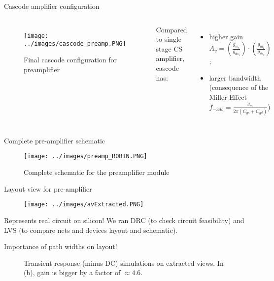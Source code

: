 \documentclass[aspectratio=169,xcolor=dvipsnames]{beamer}
\begin{document}
	\begin{frame}{Cascode amplifier configuration}
		\begin{columns}[c] %
			
			\begin{figure}[h!]
				\centering
				\texttt{[image: ../images/cascode\_preamp.PNG]}
				\label{Cascode_preamp}
				\caption{Final cascode configuration for preamplifier}
			\end{figure}
			
			Compared to single stage CS amplifier, cascode has:
			\begin{itemize}
				\item higher gain $A_v = \left(\frac{g_{m_1}}{g_{ds_1}}\right)\cdot \left(\frac{g_{m_2}}{g_{ds_2}}\right)$;
				\item larger bandwidth (consequence of the Miller Effect $f_{-3db} = \frac{g_m}{2\pi(C_{gs} + C_{gd})}$)
			\end{itemize}
			
		\end{columns}
	\end{frame}
	
	\begin{frame}{Complete pre-amplifier schematic}
		\begin{figure}[h!]
			\centering
			\texttt{[image: ../images/preamp\_ROBIN.PNG]}
			\label{preamp_robin}
			\caption{Complete schematic for the preamplifier module}
		\end{figure}
	\end{frame}
	
	\begin{frame}{Layout view for pre-amplifier}
		\begin{figure}[h!]
			\centering
			\texttt{[image: ../images/avExtracted.PNG]}
			\label{avExtracted}
		\end{figure}
		\begin{block}{}
			Represents real circuit on silicon! We ran DRC (to check circuit feasibility) and LVS (to compare nets and devices layout and schematic).
		\end{block}
	\end{frame}
	
	\begin{frame}{Importance of path widths on layout!}
		\begin{figure}[h!]
			\centering
			\hfill
			\caption{Transient response (minus DC) simulations on extracted views. In (b), gain is bigger by a factor of $\approx 4.6$.}
			\label{simuConfig}
		\end{figure}
	\end{frame}
	
\end{document}
